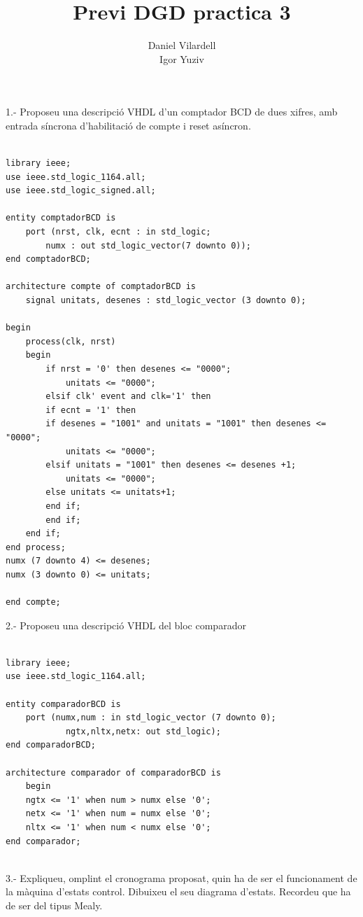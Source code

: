 \documentclass[12pt, a4papre]{article}
\author{Daniel Vilardell\\
	   Igor Yuziv}
\title{Previ DGD practica 3}
\date{}
\begin{document}
	\maketitle

	1.- Proposeu una descripció VHDL d’un comptador BCD de dues xifres, amb entrada
síncrona d’habilitació de compte i reset asíncron.

	\begin{lstlisting}[style=vhdl, frame=single, basicstyle=\tiny]
	
library ieee;
use ieee.std_logic_1164.all;
use ieee.std_logic_signed.all;

entity comptadorBCD is
	port (nrst, clk, ecnt : in std_logic;
		numx : out std_logic_vector(7 downto 0));
end comptadorBCD;

architecture compte of comptadorBCD is 
	signal unitats, desenes : std_logic_vector (3 downto 0);
	
begin 
	process(clk, nrst)
	begin
	    if nrst = '0' then desenes <= "0000";
			unitats <= "0000";
	    elsif clk' event and clk='1' then
		if ecnt = '1' then
		if desenes = "1001" and unitats = "1001" then desenes <= "0000";
			unitats <= "0000";
		elsif unitats = "1001" then desenes <= desenes +1;
			unitats <= "0000";
		else unitats <= unitats+1;
		end if;
	    end if;
	end if;
end process;
numx (7 downto 4) <= desenes;
numx (3 downto 0) <= unitats;

end compte;
\end{lstlisting}


2.- Proposeu una descripció VHDL del bloc comparador

	\begin{lstlisting}[style=vhdl, frame=single, basicstyle=\tiny]
	
library ieee;
use ieee.std_logic_1164.all;

entity comparadorBCD is 
	port (numx,num : in std_logic_vector (7 downto 0);
			ngtx,nltx,netx: out std_logic);
end comparadorBCD;

architecture comparador of comparadorBCD is 
	begin
	ngtx <= '1' when num > numx else '0';
	netx <= '1' when num = numx else '0';
	nltx <= '1' when num < numx else '0';
end comparador;
	
	\end{lstlisting}
	
	3.- Expliqueu, omplint el cronograma proposat, quin ha de ser el funcionament de la
màquina d’estats control. Dibuixeu el seu diagrama d’estats. Recordeu que ha de ser
del tipus Mealy.
\end{document}

